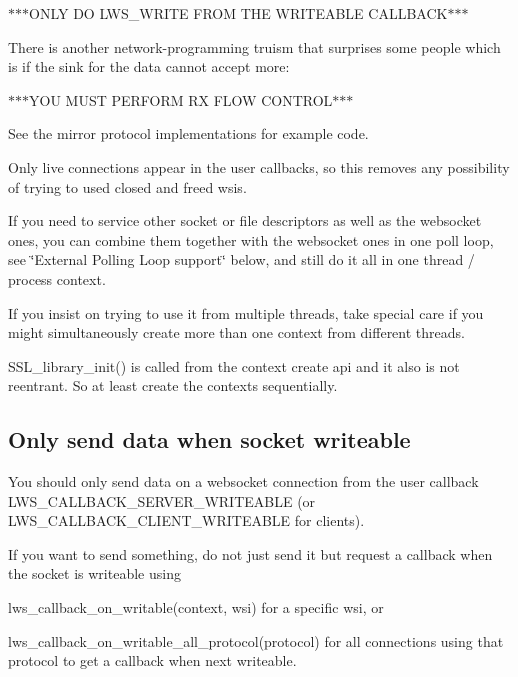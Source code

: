 $\ast$$\ast$$\ast$\+O\+N\+LY DO L\+W\+S\+\_\+\+W\+R\+I\+TE F\+R\+OM T\+HE W\+R\+I\+T\+E\+A\+B\+LE C\+A\+L\+L\+B\+A\+C\+K$\ast$$\ast$$\ast$

There is another network-\/programming truism that surprises some people which is if the sink for the data cannot accept more\+:

$\ast$$\ast$$\ast$\+Y\+OU M\+U\+ST P\+E\+R\+F\+O\+RM RX F\+L\+OW C\+O\+N\+T\+R\+O\+L$\ast$$\ast$$\ast$

See the mirror protocol implementations for example code.

Only live connections appear in the user callbacks, so this removes any possibility of trying to used closed and freed wsis.

If you need to service other socket or file descriptors as well as the websocket ones, you can combine them together with the websocket ones in one poll loop, see \char`\"{}\+External Polling Loop support\char`\"{} below, and still do it all in one thread / process context.

If you insist on trying to use it from multiple threads, take special care if you might simultaneously create more than one context from different threads.

S\+S\+L\+\_\+library\+\_\+init() is called from the context create api and it also is not reentrant. So at least create the contexts sequentially.

\subsection*{Only send data when socket writeable }

You should only send data on a websocket connection from the user callback {\ttfamily L\+W\+S\+\_\+\+C\+A\+L\+L\+B\+A\+C\+K\+\_\+\+S\+E\+R\+V\+E\+R\+\_\+\+W\+R\+I\+T\+E\+A\+B\+LE} (or {\ttfamily L\+W\+S\+\_\+\+C\+A\+L\+L\+B\+A\+C\+K\+\_\+\+C\+L\+I\+E\+N\+T\+\_\+\+W\+R\+I\+T\+E\+A\+B\+LE} for clients).

If you want to send something, do not just send it but request a callback when the socket is writeable using


\begin{DoxyItemize}
\item {\ttfamily lws\+\_\+callback\+\_\+on\+\_\+writable(context, wsi)} for a specific {\ttfamily wsi}, or
\item {\ttfamily lws\+\_\+callback\+\_\+on\+\_\+writable\+\_\+all\+\_\+protocol(protocol)} for all connections using that protocol to get a callback when next writeable.
\end{DoxyItemize}

